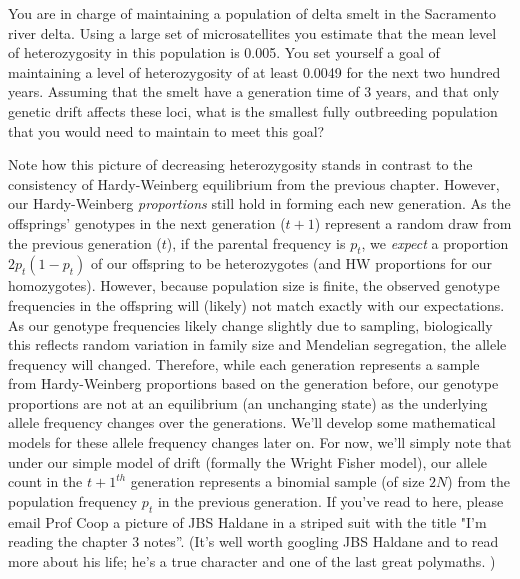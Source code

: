 \begin{question} You are in charge of maintaining a population of delta smelt in the Sacramento river delta. Using a large set of microsatellites you
  estimate that the mean level of heterozygosity in this population is 0.005.
  You set yourself a goal of maintaining a level of heterozygosity of at least
  0.0049 for the next two hundred years. Assuming that the smelt have a
  generation time of 3 years, and that only genetic drift affects these loci, what is the smallest fully outbreeding population that you would need to maintain to meet this goal?  
\end{question}

Note how this picture of decreasing heterozygosity stands in contrast to the
consistency of Hardy-Weinberg equilibrium from the previous chapter. 
However, our Hardy-Weinberg \emph{proportions} still hold in forming each new generation. As the offsprings' genotypes in the next generation ($t+1$) represent a random
draw from the previous generation ($t$), if the parental frequency is $p_t$, we \emph{expect} a proportion $2p_t(1-p_t)$ of our offspring to be
heterozygotes (and HW proportions for our homozygotes). However, because population size is finite, the
observed genotype frequencies in the offspring will (likely) not match exactly with our expectations. As our genotype frequencies likely change slightly due
to sampling, biologically this reflects random variation in family size
and Mendelian segregation, the allele frequency will changed. Therefore, while each generation represents a sample from
Hardy-Weinberg proportions based on the generation before, our
genotype proportions are not at an equilibrium (an unchanging state) as the
underlying allele frequency changes over the generations. We'll develop some mathematical models for these allele
frequency changes later on. For now, we'll simply note that
under our simple model of drift (formally the Wright Fisher model), our
allele count in the $t+1^{th}$ generation represents a binomial sample
(of size $2N$) from the population frequency $p_t$ in the previous
generation.  If you've read to here, please email Prof Coop a picture of JBS Haldane in a striped suit with the title "I'm reading the chapter 3 notes''. (It's well worth googling JBS Haldane and to read more about his life; he's a true character and one of the last great polymaths. )



